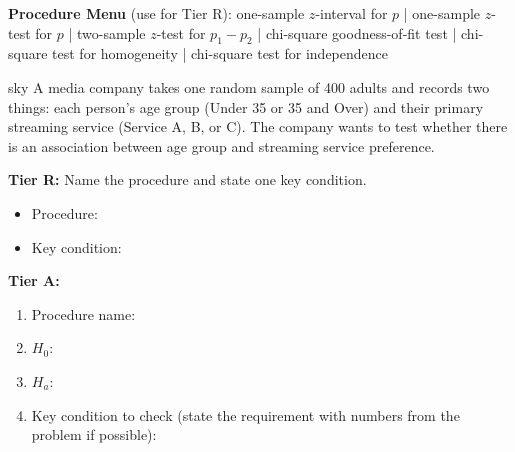 \documentclass[10pt]{article}
\begin{document}
\namepartnerperiod

\vspace{0.08in}

\textbf{Procedure Menu} (use for Tier R): one-sample $z$-interval for $p$ \;|\;
one-sample $z$-test for $p$ \;|\; two-sample $z$-test for $p_1-p_2$ \;|\;
chi-square goodness-of-fit test \;|\;
chi-square test for homogeneity \;|\;
chi-square test for independence

\vspace{0.06in}

\begin{scenariobox}{sky}
A media company takes one random sample of 400 adults and records two things: each person's
age group (Under 35 or 35 and Over) and their primary streaming service (Service A, B, or C).
The company wants to test whether there is an association between age group and streaming
service preference.

\textbf{Tier R:} Name the procedure and state one key condition.
\begin{itemize}
  \item Procedure: \blank{8cm}
  \item Key condition: \blank{7cm}
\end{itemize}

\textbf{Tier A:}
\begin{enumerate}
  \item Procedure name: \blank{8cm}
  \item $H_0$: \writeline
  \item $H_a$: \writeline
  \item Key condition to check (state the requirement with numbers from the problem if possible):
        \writeline
\end{enumerate}
\end{scenariobox}
\end{document}
